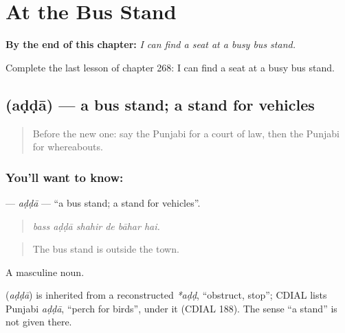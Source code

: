
\chapter{At the Bus Stand}
\label{ch:pa-a2-at-the-bus-stand}

\begin{chapteropening}
\textbf{By the end of this chapter:} \emph{I can find a seat at a busy bus stand.}

Complete the last lesson of chapter 268: I can find a seat at a busy bus stand.
\end{chapteropening}

\section[\texorpdfstring{\pa{ਅੱਡਾ} (aḍḍā)}{ਅੱਡਾ (aḍḍā)}]{ (aḍḍā) — a bus stand; a stand for vehicles}

\label{lesson:PA-C268-adda}



\begin{quote}
Before the new one: say the Punjabi for a court of law, then the Punjabi for whereabouts.
\end{quote}

\subsection*{You'll want to know: }
\textbf{} — \emph{aḍḍā} — \textquotedblleft{}a bus stand; a stand for vehicles\textquotedblright{}.

\begin{quote}
     
\end{quote}

\begin{quote}
\emph{bass aḍḍā shahir de bāhar hai.}
\end{quote}

\begin{quote}
The bus stand is outside the town.
\end{quote}

A masculine noun.

\begin{cousinweb}
\textbf{} (\emph{aḍḍā}) is inherited from a reconstructed \emph{*aḍḍ}, \textquotedblleft{}obstruct, stop\textquotedblright{}; CDIAL lists Punjabi \emph{aḍḍā}, \textquotedblleft{}perch for birds\textquotedblright{}, under it (CDIAL 188). The sense \textquotedblleft{}a stand\textquotedblright{} is not given there.
\end{cousinweb}

